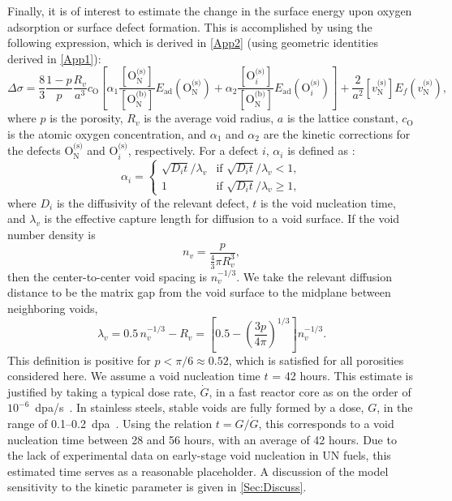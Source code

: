 \documentclass[preprint,12pt,sort&compress]{elsarticle}
\newcommand{\?}{\stackrel{?}{=}}
\begin{document}
Finally, it is of interest to estimate the change in the surface energy upon oxygen adsorption or surface defect formation. This is accomplished by using the following expression, which is derived in \ref{App2} (using geometric identities derived in \ref{App1}):
\begin{equation}
\Delta \sigma = \frac{8}{3} \frac{1-p}{p} \frac{R_v}{a^3} c_\text{O} \left[ \alpha_1 \frac{ [ \text{O}_\text{N}^{\text{(s)}} ] }{ [ \text{O}_\text{N}^{\text{(b)}} ] }  E_\text{ad}( \text{O}_\text{N}^{\text{(s)}} ) + \alpha_2 \frac{ [ \text{O}_i^{\text{(s)}} ] }{ [ \text{O}_\text{N}^{\text{(b)}} ] }  E_\text{ad}( \text{O}_i^{\text{(s)}} ) \right] + \frac{2}{a^2} [ v_\text{N}^{\text{(s)}} ] E_f ( v_\text{N}^{\text{(s)}} ),
\label{Eq:DeltaSigma1}
\end{equation}
where $p$ is the porosity, $R_v$ is the average void radius, $a$ is the lattice constant, $c_\text{O}$ is the atomic oxygen concentration, and $\alpha_1$ and $\alpha_2$ are the kinetic corrections for the defects $\text{O}_\text{N}^\text{(s)}$ and $\text{O}_i^{\text{(s)}}$, respectively. For a defect $i$, $\alpha_i$ is defined as \cite{Zinkle1990}:
\begin{equation}
\alpha_i =
\begin{cases}
    \sqrt{D_i t}/\lambda_v & \text{if } \sqrt{D_i t}/\lambda_v < 1, \\
    1 & \text{if } \sqrt{D_i t}/\lambda_v \geq 1,
\end{cases}
\label{Eq:alpha}
\end{equation}
where $D_i$ is the diffusivity of the relevant defect, $t$ is the void nucleation time, and $\lambda_v$ is the effective capture length for diffusion to a void surface. If the void number density is
\begin{equation}
n_v = \frac{p}{\frac{4}{3}\pi R_v^3},
\end{equation}
then the center-to-center void spacing is $n_v^{-1/3}$. We take the relevant diffusion distance to be the matrix gap from the void surface to the midplane between neighboring voids,
\begin{equation}
\lambda_v
=
0.5\,n_v^{-1/3} - R_v
=
\left[0.5-\left(\frac{3p}{4\pi}\right)^{1/3}\right]n_v^{-1/3}.
\label{Eq:lambda_eff}
\end{equation}
This definition is positive for $p<\pi/6\approx0.52$, which is satisfied for all porosities considered here. We assume a void nucleation time $t$ = 42 hours. This estimate is justified by taking a typical dose rate, $\dot{G}$, in a fast reactor core as on the order of $10^{-6}$~dpa/s~\cite{Mansur1983, Saha2018}. In stainless steels, stable voids are fully formed by a dose, $G$, in the range of 0.1--0.2~dpa~\cite{Surh2004}. Using the relation $t = G / \dot{G}$, this corresponds to a void nucleation time between 28 and 56 hours, with an average of 42 hours. Due to the lack of experimental data on early-stage void nucleation in UN fuels, this estimated time serves as a reasonable placeholder. A discussion of the model sensitivity to the kinetic parameter is given in \cref{Sec:Discuss}.
\end{document}
